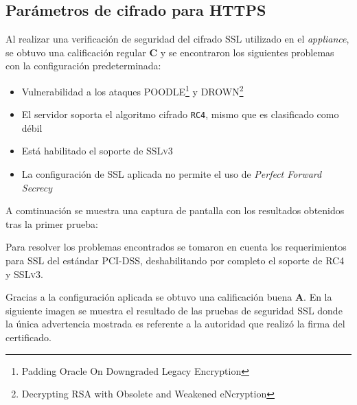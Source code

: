       \subsection {Par\'{a}metros de cifrado para \textsc{HTTPS}}

Al realizar una verificaci\'{o}n de seguridad del cifrado \textsc{\gls{SSL}} utilizado en el \textsl{appliance}, se obtuvo una calificaci\'{o}n regular \textbf{C} y se encontraron los siguientes problemas con la configuraci\'{o}n predeterminada:

\begin{itemize}
  \item Vulnerabilidad a los ataques \textsc{POODLE}\footnote{Padding Oracle On Downgraded Legacy Encryption} \cite{_ssl_????-1} \cite{_ssl-poodle.pdf_????} \cite{_this_????} \cite{barnes_poodle_????} \cite{_security_????-1} y \textsc{DROWN}\footnote{Decrypting RSA with Obsolete and Weakened eNcryption} \cite{_drown_????} \cite{_openssl_????}

  \item El servidor soporta el algoritmo cifrado \texttt{RC4}, mismo que es clasificado como d\'{e}bil \cite{_security_????}

  \item Est\'{a} habilitado el soporte de \textsc{SSLv3}

  \item La configuraci\'{o}n de \textsc{\gls{SSL}} aplicada no permite el uso de \textsl{Perfect Forward Secrecy} \cite{_forward_2016}
\end{itemize}

A comtinuaci\'{o}n se muestra una captura de pantalla con los resultados obtenidos tras la primer prueba:


Para resolver los problemas encontrados se tomaron en cuenta los requerimientos para \textsc{\gls{SSL}} del est\'{a}ndar \textsc{\gls{PCI-DSS}}, deshabilitando por completo el soporte de \textsc{RC4} y \textsc{SSLv3}.

Gracias a la configuraci\'{o}n aplicada se obtuvo una calificaci\'{o}n buena \textbf{A}. En la siguiente imagen se muestra el resultado de las pruebas de seguridad SSL donde la \'{u}nica advertencia mostrada es referente a la autoridad que realiz\'{o} la firma del certificado. \cite{_ssl_????}


